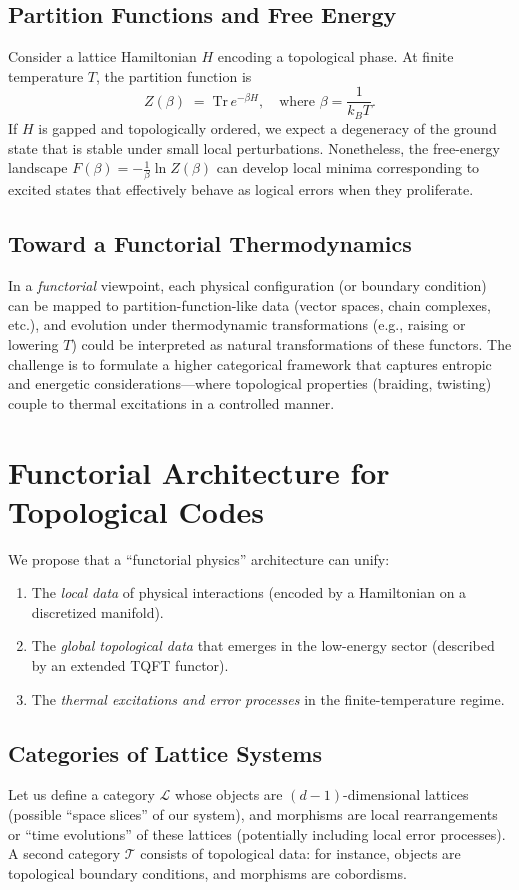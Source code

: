 \documentclass[12pt]{article}
\begin{document}
\subsection{Partition Functions and Free Energy}
Consider a lattice Hamiltonian $H$ encoding a topological phase. At finite temperature $T$, the partition function is 
\[
Z(\beta) \;=\; \mathrm{Tr}\, e^{-\beta H}, 
\quad \text{where } \beta = \frac{1}{k_B T}.
\]
If $H$ is gapped and topologically ordered, we expect a degeneracy of the ground state that is stable under small local perturbations. Nonetheless, the free-energy landscape $F(\beta) = -\frac{1}{\beta}\ln Z(\beta)$ can develop local minima corresponding to excited states that effectively behave as logical errors when they proliferate.

\subsection{Toward a Functorial Thermodynamics}
In a \emph{functorial} viewpoint, each physical configuration (or boundary condition) can be mapped to partition-function-like data (vector spaces, chain complexes, etc.), and evolution under thermodynamic transformations (e.g., raising or lowering $T$) could be interpreted as natural transformations of these functors. The challenge is to formulate a higher categorical framework that captures entropic and energetic considerations---where topological properties (braiding, twisting) couple to thermal excitations in a controlled manner.

\section{Functorial Architecture for Topological Codes}
We propose that a “functorial physics” architecture can unify:
\begin{enumerate}
    \item The \emph{local data} of physical interactions (encoded by a Hamiltonian on a discretized manifold).
    \item The \emph{global topological data} that emerges in the low-energy sector (described by an extended TQFT functor).
    \item The \emph{thermal excitations and error processes} in the finite-temperature regime.
\end{enumerate}

\subsection{Categories of Lattice Systems}
Let us define a category $\mathcal{L}$ whose objects are $(d\!-\!1)$-dimensional lattices (possible “space slices” of our system), and morphisms are local rearrangements or “time evolutions” of these lattices (potentially including local error processes). A second category $\mathcal{T}$ consists of topological data: for instance, objects are topological boundary conditions, and morphisms are cobordisms.
\end{document}
